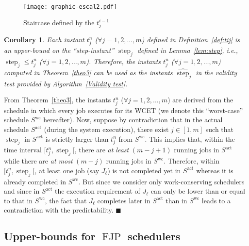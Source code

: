 \documentclass[10pt,english,a4paper]{article}
\newtheorem{corollary}{Corollary}
\newenvironment{proof}[1][Proof]{\begin{trivlist}
\item[\hskip \labelsep {\bfseries #1}]}{\end{trivlist}}
\newtheorem{validity test}{Validity Test}
\newcommand{\FJP}{\operatorname{FJP}}
\newcommand{\step}{\widehat{\operatorname{step}}}
\newcommand{\minstep}{\operatorname{step}}
\newcommand{\fin}{\hfill{\small $\blacksquare$}}     \newcommand{\oh}[1]{\ensuremath{\mathcal{0}{(#1)}}} \def\thefootnote{\arabic{footnote}}
\begin{document}
\begin{figure}[!h]
\centering
\texttt{[image: graphic-escal2.pdf]}
\caption{Staircase defined by the $t_{j}^{i-1}$}
\label{fig:staircase}
\end{figure}

\begin{corollary}
Each instant $t^n_{j}$ ($\forall j = 1, 2, \ldots, m$) defined in Definition~\ref{def:tij} is an upper-bound on the ``step-instant'' $\minstep_j$ defined in Lemma~\ref{lem:step}, i.e., $\minstep_j \leq t^n_j$ ($\forall j = 1, 2, \ldots, m$). Therefore, the instants $t^n_{j}$ ($\forall j = 1, 2, \ldots, m$) computed in Theorem~\ref{theo3} can be used as the instants $\step_j$ in the validity test provided by Algorithm~\ref{Validity test}.
\end{corollary}

\begin{proof}
From Theorem~\ref{theo3}, the instants $t^n_{j}$ ($\forall j = 1, 2, \ldots, m$) are derived from the schedule in which every job executes for its WCET (we denote this ``worst-case'' schedule $S^{\operatorname{wc}}$ hereafter). Now, suppose by contradiction that in the actual schedule $S^{\operatorname{act}}$ (during the system execution), there exist $j \in \left[ 1, m \right]$ such that $\minstep_j$ in $S^{\operatorname{act}}$ is strictly larger than $t^n_j$ from $S^{\operatorname{wc}}$. This implies that, within the time interval $[ t^n_j, \minstep_j [$, there are \emph{at least} $(m-j+1)$ running jobs in $S^{\operatorname{act}}$ while there are \emph{at most} $(m-j)$ running jobs in $S^{\operatorname{wc}}$. Therefore, within $[ t^n_j, \minstep_j [$, at least one job (say $J_{\ell}$) is not completed yet in $S^{\operatorname{act}}$ whereas it is already completed in $S^{\operatorname{wc}}$. But since we consider only work-conserving schedulers and since in $S^{\operatorname{act}}$ the execution requirement of $J_{\ell}$ can only be lower than or equal to that in $S^{\operatorname{wc}}$, the fact that $J_{\ell}$ completes later in $S^{\operatorname{act}}$ than in $S^{\operatorname{wc}}$ leads to a contradiction with the predictability. \fin
\end{proof}





\subsection{Upper-bounds for $\FJP$ schedulers}
\label{sec:proofsFJP}
\end{document}
